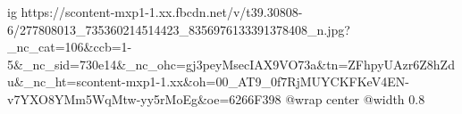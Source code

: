  
 
 
 
 

\ifcmt
  ig https://scontent-mxp1-1.xx.fbcdn.net/v/t39.30808-6/277808013_735360214514423_8356976133391378408_n.jpg?_nc_cat=106&ccb=1-5&_nc_sid=730e14&_nc_ohc=gj3peyMsecIAX9VO73a&tn=ZFhpyUAzr6Z8hZdu&_nc_ht=scontent-mxp1-1.xx&oh=00_AT9_0f7RjMUYCKFKeV4EN-v7YXO8YMm5WqMtw-yy5rMoEg&oe=6266F398
  @wrap center
  @width 0.8
\fi
